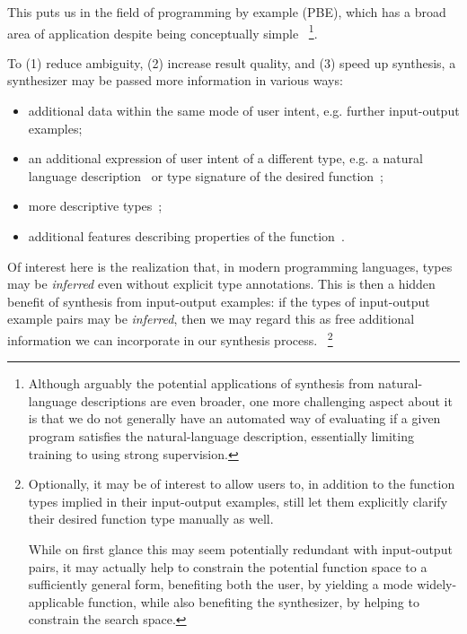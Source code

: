 \documentclass{article}
\begin{document}
This puts us in the field of programming by example (PBE),
which has a broad area of application despite being conceptually simple%
~\footnote{
    Although arguably the potential applications of synthesis from natural-language descriptions are even broader,
    one more challenging aspect about it is that we do not generally have an automated way of evaluating if a given program satisfies the natural-language description,
    essentially limiting training to using strong supervision.
}.

To (1) reduce ambiguity, (2) increase result quality, and (3) speed up synthesis, a synthesizer may be passed more information in various ways:
\begin{itemize}
    \item additional data within the same mode of user intent, e.g. further input-output examples;
    \item an additional expression of user intent of a different type, e.g. a natural language description~\citep{polosukhin2018neural} or type signature of the desired function~\citep{myth};
    \item more descriptive types~\citep{synquid};
    \item additional features describing properties of the function~\citep{odena2020learning}.
\end{itemize}

Of interest here is the realization that, in modern programming languages, types may be \emph{inferred} even without explicit type annotations.
This is then a hidden benefit of synthesis from input-output examples:
if the types of input-output example pairs may be \emph{inferred},
then we may regard this as free additional information we can incorporate in our synthesis process.%
~\footnote{
    Optionally, it may be of interest to allow users to,
    in addition to the function types implied in their input-output examples,
    still let them explicitly clarify their desired function type manually as well.

    While on first glance this may seem potentially redundant with input-output pairs,
    it may actually help to constrain the potential function space to a sufficiently general form,
    benefiting both the user,
    by yielding a mode widely-applicable function,
    while also benefiting the synthesizer,
    by helping to constrain the search space.
}
\end{document}
